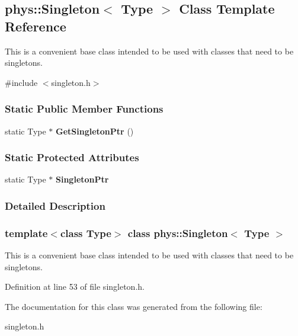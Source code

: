 \hypertarget{classphys_1_1Singleton}{
\subsection{phys::Singleton$<$ Type $>$ Class Template Reference}
\label{classphys_1_1Singleton}
}


This is a convenient base class intended to be used with classes that need to be singletons.  




{\ttfamily \#include $<$singleton.h$>$}

\subsubsection*{Static Public Member Functions}
\begin{DoxyCompactItemize}
\item 
\hypertarget{classphys_1_1Singleton_a85abc4799733f13dea8b1e737b54c6fd}{
static Type $\ast$ {\bfseries GetSingletonPtr} ()}
\label{classphys_1_1Singleton_a85abc4799733f13dea8b1e737b54c6fd}

\end{DoxyCompactItemize}
\subsubsection*{Static Protected Attributes}
\begin{DoxyCompactItemize}
\item 
\hypertarget{classphys_1_1Singleton_a1be84eb8cb714e0456fa74ad4a123031}{
static Type $\ast$ {\bfseries SingletonPtr}}
\label{classphys_1_1Singleton_a1be84eb8cb714e0456fa74ad4a123031}

\end{DoxyCompactItemize}


\subsubsection{Detailed Description}
\subsubsection*{template$<$class Type$>$ class phys::Singleton$<$ Type $>$}

This is a convenient base class intended to be used with classes that need to be singletons. 

Definition at line 53 of file singleton.h.



The documentation for this class was generated from the following file:\begin{DoxyCompactItemize}
\item 
singleton.h\end{DoxyCompactItemize}
